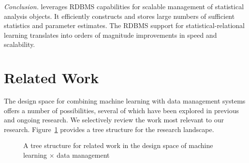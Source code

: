 \begin{table}[htbp] \caption{Learning Time Comparison (sec) with other statistical-relational learning systems. NT = non-termination}
  \centering
  \label{tab:othersrl}%
\end{table}%

{\em Conclusion.} \FB  leverages RDBMS capabilities for scalable management of statistical analysis objects. It efficiently constructs and stores large numbers of sufficient statistics and parameter estimates. 
The RDBMS support for statistical-relational learning translates into orders of magnitude improvements in speed and scalability.


\section{Related Work} \label{sec:related}

The design space for combining machine learning with data management systems offers a number of possibilities, several of which have been explored in previous and ongoing research. 
We selectively review the work most relevant to our research. Figure~\ref{fig:related} provides a tree structure for the research landscape. 

\begin{figure}[htbp] %
 \centering
{}
\caption{A tree structure for related work in the design space of machine learning $\times$ data management}
\label{fig:related}
\end{figure}

